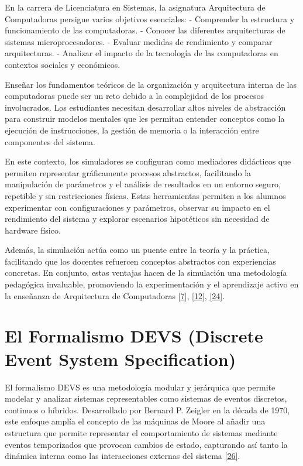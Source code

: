 \documentclass[12pt,oneside]{templates/unerthesis}
\begin{document}
En la carrera de Licenciatura en Sistemas, la asignatura Arquitectura de Computadoras persigue varios objetivos esenciales:
- Comprender la estructura y funcionamiento de las computadoras.
- Conocer las diferentes arquitecturas de sistemas microprocesadores.
- Evaluar medidas de rendimiento y comparar arquitecturas.
- Analizar el impacto de la tecnología de las computadoras en contextos sociales y económicos.

Enseñar los fundamentos teóricos de la organización y arquitectura interna de las computadoras puede ser un reto debido a la complejidad de los procesos involucrados. Los estudiantes necesitan desarrollar altos niveles de abstracción para construir modelos mentales que les permitan entender conceptos como la ejecución de instrucciones, la gestión de memoria o la interacción entre componentes del sistema.

En este contexto, los simuladores se configuran como mediadores didácticos que permiten representar gráficamente procesos abstractos, facilitando la manipulación de parámetros y el análisis de resultados en un entorno seguro, repetible y sin restricciones físicas. Estas herramientas permiten a los alumnos experimentar con configuraciones y parámetros, observar su impacto en el rendimiento del sistema y explorar escenarios hipotéticos sin necesidad de hardware físico.

Además, la simulación actúa como un puente entre la teoría y la práctica, facilitando que los docentes refuercen conceptos abstractos con experiencias concretas. En conjunto, estas ventajas hacen de la simulación una metodología pedagógica invaluable, promoviendo la experimentación y el aprendizaje activo en la enseñanza de Arquitectura de Computadoras \protect\hyperlink{ref-garcia-garcia_pbbcache_2020}{{[}7{]}}, \protect\hyperlink{ref-nova_tool_2013}{{[}12{]}}, \protect\hyperlink{ref-skrien_cpu_2001}{{[}24{]}}.

\hypertarget{el-formalismo-devs-discrete-event-system-specification}{%
\section{El Formalismo DEVS (Discrete Event System Specification)}\label{el-formalismo-devs-discrete-event-system-specification}}

El formalismo DEVS es una metodología modular y jerárquica que permite modelar y analizar sistemas representables como sistemas de eventos discretos, continuos o híbridos. Desarrollado por Bernard P. Zeigler en la década de 1970, este enfoque amplía el concepto de las máquinas de Moore al añadir una estructura que permite representar el comportamiento de sistemas mediante eventos temporizados que provocan cambios de estado, capturando así tanto la dinámica interna como las interacciones externas del sistema \protect\hyperlink{ref-zeigler_theory_2000}{{[}26{]}}.
\end{document}
